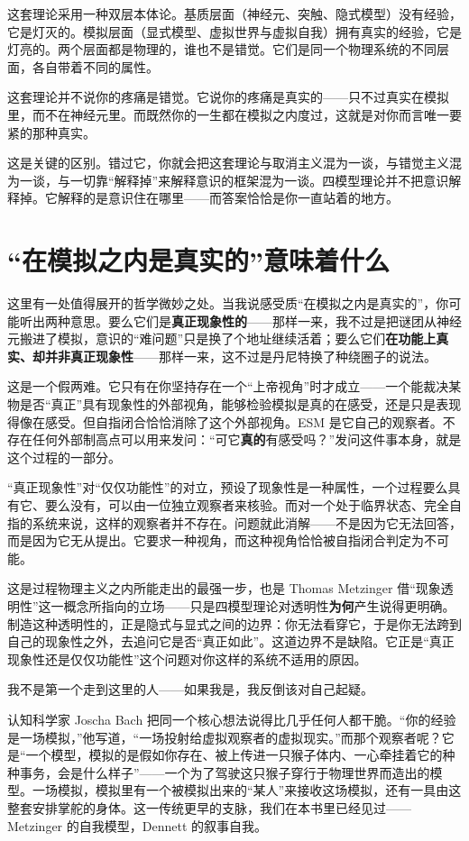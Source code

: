 \documentclass[11pt, twoside, openright]{book}
\begin{document}
这套理论采用一种双层本体论。基质层面（神经元、突触、隐式模型）没有经验，它是灯灭的。模拟层面（显式模型、虚拟世界与虚拟自我）拥有真实的经验，它是灯亮的。两个层面都是物理的，谁也不是错觉。它们是同一个物理系统的不同层面，各自带着不同的属性。

这套理论并不说你的疼痛是错觉。它说你的疼痛是真实的------只不过真实在模拟里，而不在神经元里。而既然你的一生都在模拟之内度过，这就是对你而言唯一要紧的那种真实。

这是关键的区别。错过它，你就会把这套理论与取消主义混为一谈，与错觉主义混为一谈，与一切靠“解释掉”来解释意识的框架混为一谈。四模型理论并不把意识解释掉。它解释的是意识住在哪里------而答案恰恰是你一直站着的地方。

\section*{“在模拟之内是真实的”意味着什么}

这里有一处值得展开的哲学微妙之处。当我说感受质“在模拟之内是真实的”，你可能听出两种意思。要么它们是\textbf{真正现象性的}------那样一来，我不过是把谜团从神经元搬进了模拟，意识的“难问题”只是换了个地址继续活着；要么它们\textbf{在功能上真实、却并非真正现象性}------那样一来，这不过是丹尼特换了种绕圈子的说法。

这是一个假两难。它只有在你坚持存在一个“上帝视角”时才成立------一个能裁决某物是否“真正”具有现象性的外部视角，能够检验模拟是真的在感受，还是只是表现得像在感受。但自指闭合恰恰消除了这个外部视角。ESM 是它自己的观察者。不存在任何外部制高点可以用来发问：“可它\textbf{真的}有感受吗？”发问这件事本身，就是这个过程的一部分。

“真正现象性”对“仅仅功能性”的对立，预设了现象性是一种属性，一个过程要么具有它、要么没有，可以由一位独立观察者来核验。而对一个处于临界状态、完全自指的系统来说，这样的观察者并不存在。问题就此消解------不是因为它无法回答，而是因为它无从提出。它要求一种视角，而这种视角恰恰被自指闭合判定为不可能。

这是过程物理主义之内所能走出的最强一步，也是 Thomas Metzinger 借“现象透明性”这一概念所指向的立场------只是四模型理论对透明性\textbf{为何}产生说得更明确。制造这种透明性的，正是隐式与显式之间的边界：你无法看穿它，于是你无法跨到自己的现象性之外，去追问它是否“真正如此”。这道边界不是缺陷。它正是“真正现象性还是仅仅功能性”这个问题对你这样的系统不适用的原因。

我不是第一个走到这里的人------如果我是，我反倒该对自己起疑。

认知科学家 Joscha Bach 把同一个核心想法说得比几乎任何人都干脆。“你的经验是一场模拟，”他写道，“一场投射给虚拟观察者的虚拟现实。”而那个观察者呢？它是“一个模型，模拟的是假如你存在、被上传进一只猴子体内、一心牵挂着它的种种事务，会是什么样子”------一个为了驾驶这只猴子穿行于物理世界而造出的模型。一场模拟，模拟里有一个被模拟出来的“某人”来接收这场模拟，还有一具由这整套安排掌舵的身体。这一传统更早的支脉，我们在本书里已经见过------Metzinger 的自我模型，Dennett 的叙事自我。
\end{document}
